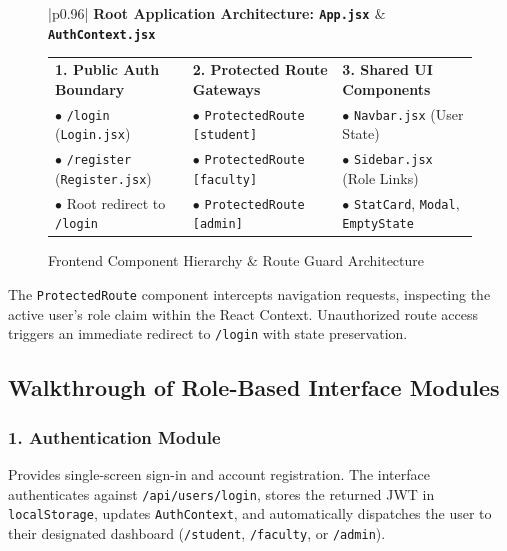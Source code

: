 \documentclass[11pt,a4paper]{article}
\begin{document}
\begin{figure}[H]
\centering
\small
\begin{tabular}{|p{}|}
\hline
{} \centering\textbf{\color{primary}Root Application Architecture: \texttt{App.jsx} $\&$ \texttt{AuthContext.jsx}} \tabularnewline
\hline
\vspace{0.1cm}
\begin{tabular}{@{}p{}p{}p{}@{}}
\textbf{\color{secondary}1. Public Auth Boundary} & \textbf{\color{secondary}2. Protected Route Gateways} & \textbf{\color{secondary}3. Shared UI Components} \\
$\bullet$ \texttt{/login} (\texttt{Login.jsx}) & $\bullet$ \texttt{ProtectedRoute [student]} & $\bullet$ \texttt{Navbar.jsx} (User State) \\
$\bullet$ \texttt{/register} (\texttt{Register.jsx}) & $\bullet$ \texttt{ProtectedRoute [faculty]} & $\bullet$ \texttt{Sidebar.jsx} (Role Links) \\
$\bullet$ Root redirect to \texttt{/login} & $\bullet$ \texttt{ProtectedRoute [admin]} & $\bullet$ \texttt{StatCard}, \texttt{Modal}, \texttt{EmptyState} \\
\end{tabular}
\vspace{0.1cm} \tabularnewline
\hline
\end{tabular}
\caption{Frontend Component Hierarchy \& Route Guard Architecture}
\label{fig:fe_tree}
\end{figure}

The \texttt{ProtectedRoute} component intercepts navigation requests, inspecting the active user's role claim within the React Context. Unauthorized route access triggers an immediate redirect to \texttt{/login} with state preservation.

\subsection{Walkthrough of Role-Based Interface Modules}

\subsubsection{1. Authentication Module}
Provides single-screen sign-in and account registration. The interface authenticates against \texttt{/api/users/login}, stores the returned JWT in \texttt{localStorage}, updates \texttt{AuthContext}, and automatically dispatches the user to their designated dashboard (\texttt{/student}, \texttt{/faculty}, or \texttt{/admin}).
\end{document}
